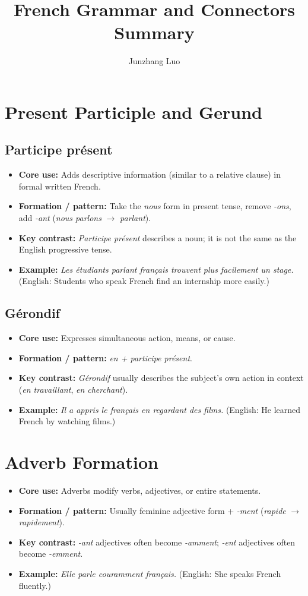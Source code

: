 \documentclass{article}
\title{French Grammar and Connectors Summary}
\author{Junzhang Luo}
\begin{document}
\tableofcontents

\newpage

\section{Present Participle and Gerund}

\subsection{Participe présent}
\begin{itemize}
    \item \textbf{Core use:} Adds descriptive information (similar to a relative clause) in formal written French.
    \item \textbf{Formation / pattern:} Take the \textit{nous} form in present tense, remove \textit{-ons}, add \textit{-ant} (\textit{nous parlons} $\to$ \textit{parlant}).
    \item \textbf{Key contrast:} \textit{Participe présent} describes a noun; it is not the same as the English progressive tense.
    \item \textbf{Example:} \textit{Les étudiants parlant français trouvent plus facilement un stage.} (English: Students who speak French find an internship more easily.)
\end{itemize}

\subsection{Gérondif}
\begin{itemize}
    \item \textbf{Core use:} Expresses simultaneous action, means, or cause.
    \item \textbf{Formation / pattern:} \textit{en + participe présent}.
    \item \textbf{Key contrast:} \textit{Gérondif} usually describes the subject's own action in context (\textit{en travaillant}, \textit{en cherchant}).
    \item \textbf{Example:} \textit{Il a appris le français en regardant des films.} (English: He learned French by watching films.)
\end{itemize}

\section{Adverb Formation}
\begin{itemize}
    \item \textbf{Core use:} Adverbs modify verbs, adjectives, or entire statements.
    \item \textbf{Formation / pattern:} Usually feminine adjective form + \textit{-ment} (\textit{rapide} $\to$ \textit{rapidement}).
    \item \textbf{Key contrast:} \textit{-ant} adjectives often become \textit{-amment}; \textit{-ent} adjectives often become \textit{-emment}.
    \item \textbf{Example:} \textit{Elle parle couramment français.} (English: She speaks French fluently.)
\end{itemize}
\end{document}
